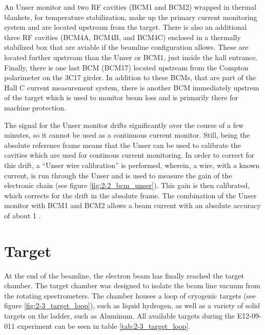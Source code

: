 \documentclass[
]{report}
\begin{document}
An Unser monitor and two RF cavities (BCM1 and BCM2) wrapped in thermal
blankets, for temperature stabilization, make up the primary current
monitoring system and are located upstream from the target. There is
also an additional three RF cavities (BCM4A, BCM4B, and BCM4C) enclosed
in a thermally stabilized box that are aviable if the beamline
configuration allows. These are located further upstream than the Unser
or BCM1, just inside the hall entrance. Finally, there is one last BCM
(BCM17) located upstream from the Compton polarimeter on the 3C17
girder. In addition to these BCMs, that are part of the Hall C current
measurement system, there is another BCM immediately upstrem of the
target which is used to monitor beam loss and is primarily there for
machine protection.



The signal for the Unser monitor drifts significantly over the course of
a few minutes, so it cannot be used as a continuous current monitor.
Still, being the absolute reference frame means that the Unser can be
used to calibrate the cavities which are used for continous current
monitoring. In order to correct for this drift, a ``Unser wire
calibration'' is performed, wherein, a wire, with a known current, is
run through the Unser and is used to measure the gain of the electronic
chain (see figure \ref{fig:2-2_bcm_unser}). This gain is then
calibrated, which corrects for the drift in the absolute frame. The
combination of the Unser monitor with BCM1 and BCM2 allows a beam
current with an absolute accuracy of about 1 \cite{denard_high_2001}.

\hypertarget{Section-4.4}{%
\section{Target}\label{Section-4.4}}

At the end of the beamline, the electron beam has finally reached the
target chamber. The target chamber was designed to isolate the beam line
vacuum from the rotating spectrometers. The chamber houses a loop of
cryogenic targets (see figure \ref{fig:2-3_target_loop}), such as liquid
hydrogen, as well as a variety of solid targets on the ladder, such as
Aluminum. All available targets during the E12-09-011 experiment can be
seen in table \ref{tab:2-3_target_loop}.




\end{document}
